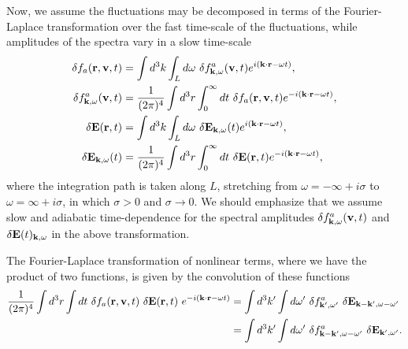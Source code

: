 \documentclass[12pt,a4paper,ruledheader]{report}
\begin{document}
Now, we assume the fluctuations may be decomposed in terms of the
Fourier-Laplace transformation over the fast time-scale of the
fluctuations, while amplitudes of the spectra vary in a slow
time-scale
\begin{equation}
\begin{split}
  \delta f_a({\bf r}, {\bf v},t)
  &=\int d^3k \int_L d \omega\
  \delta f^a_{{\bf k}, \omega}({\bf v}, t)e^{i({\bf k \cdot r}-\omega t)},\\
  \delta f^a_{{\bf k}, \omega}({\bf v}, t)
  &=\frac{1}{(2 \pi)^4} \int d^3 r \int_0^{\infty} dt\
  \delta f_a({\bf r}, {\bf v},t) e^{-i({\bf k \cdot r} - \omega t)},\\
  \delta {\bf E}({\bf r},t)
  &=\int d^3 k \int_L d \omega\ \delta {\bf E}_{{\bf k},\omega}(t)
  e^{i({\bf k \cdot r}-\omega t)},\\
  \delta {\bf E}_{{\bf k},\omega}(t)
  &=\frac{1}{(2 \pi)^4}\int d^3 r \int_0^{\infty} dt\
  \delta {\bf E}({\bf r},t) e^{-i({\bf k \cdot r} - \omega t)},
\end{split}
\end{equation}
where the integration path is taken along $L$, stretching from
$\omega = -\infty +i\sigma$ to $\omega=\infty+i\sigma$, in which
$\sigma >0$ and $\sigma \rightarrow 0$. We should emphasize that
we assume slow and adiabatic time-dependence for the spectral
amplitudes $\delta f^a_{{\bf k},\omega}({\bf v},t)$ and
$\delta {\bf E}(t)_{{\bf k}, \omega}$ in the above transformation.

The Fourier-Laplace transformation of nonlinear terms, where we
have the product of two functions, is given by the convolution
of these functions
\begin{equation}
\begin{split}
\frac{1}{(2\pi)^4}\int d^3r \int dt\ \delta f_a({\bf r}, {\bf v},t)\
\delta {\bf E}({\bf r},t)\ e^{-i({\bf k \cdot r}-\omega t)}
&=\int d^3 k' \int d \omega '\ \delta f^a_{{\bf k'}, \omega '}\
\delta {\bf E}_{{\bf k-k'},\omega-\omega '}\\
&=\int d^3 k' \int d \omega '\ \delta f^a_{{\bf k-k'}, \omega-\omega '}\
\delta {\bf E}_{{\bf k'},\omega '}.
\end{split}
\label{conv}
\end{equation}
\end{document}
